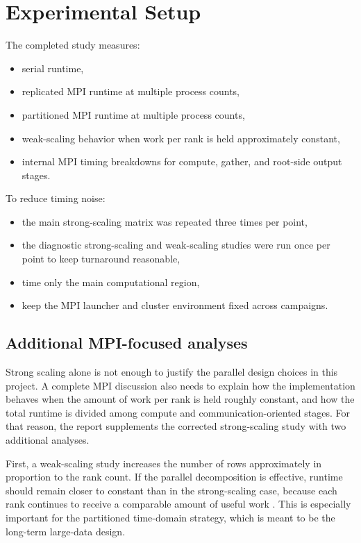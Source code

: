 \documentclass[11pt]{article}
\begin{document}
\section{Experimental Setup}
The completed study measures:
\begin{itemize}
  \item serial runtime,
  \item replicated MPI runtime at multiple process counts,
  \item partitioned MPI runtime at multiple process counts,
  \item weak-scaling behavior when work per rank is held approximately constant,
  \item internal MPI timing breakdowns for compute, gather, and root-side output stages.
\end{itemize}

To reduce timing noise:
\begin{itemize}
  \item the main strong-scaling matrix was repeated three times per point,
  \item the diagnostic strong-scaling and weak-scaling studies were run once per point to keep turnaround reasonable,
  \item time only the main computational region,
  \item keep the MPI launcher and cluster environment fixed across campaigns.
\end{itemize}

\subsection{Additional MPI-focused analyses}
Strong scaling alone is not enough to justify the parallel design choices in this project. A complete MPI discussion also needs to explain how the implementation behaves when the amount of work per rank is held roughly constant, and how the total runtime is divided among compute and communication-oriented stages. For that reason, the report supplements the corrected strong-scaling study with two additional analyses.

First, a weak-scaling study increases the number of rows approximately in proportion to the rank count. If the parallel decomposition is effective, runtime should remain closer to constant than in the strong-scaling case, because each rank continues to receive a comparable amount of useful work \cite{gustafson1988}. This is especially important for the partitioned time-domain strategy, which is meant to be the long-term large-data design.
\end{document}
